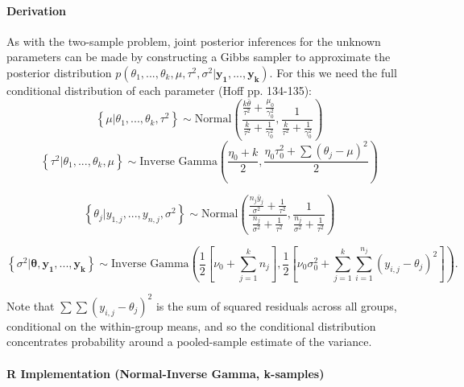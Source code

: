 \documentclass[12pt, a4paper]{article}
\begin{document}
      \paragraph{Derivation}
      As with the two-sample problem, joint posterior inferences for the unknown parameters can be made by constructing a Gibbs sampler to approximate the posterior distribution $p\left(\theta_1,...,\theta_k,\mu,\tau^2,\sigma^2|\mathbf{y_1,...,y_k}\right)$.  For this we need the full conditional distribution of each parameter (Hoff pp. 134-135):
      $$\left\{\mu|\theta_1,...,\theta_k,\tau^2\right\} \sim \text{Normal}\left(\dfrac{\frac{k\bar{\theta}}{\tau^2} + \frac{\mu_0}{\gamma^2_0}}{\frac{k}{\tau^2} + \frac{1}{\gamma^2_0}},\dfrac{1}{\frac{k}{\tau^2}+\frac{1}{\gamma^2_0}}\right)$$
      $$\left\{\tau^2|\theta_1,...,\theta_k,\mu\right\} \sim \text{Inverse Gamma}\left(\dfrac{\eta_0 + k}{2},\dfrac{\eta_0\tau^2_0 + \sum\left(\theta_j-\mu\right)^2}{2}\right)$$

      $$\left\{\theta_j|y_{1,j},...,y_{n,j},\sigma^2\right\} \sim \text{Normal}\left(\dfrac{\frac{n_j\bar{y}_j}{\sigma^2} + \frac{1}{\tau^2}}{\frac{n_j}{\sigma^2}+\frac{1}{\tau^2}},\dfrac{1}{\frac{n_j}{\sigma^2}+\frac{1}{\tau^2}}\right)$$


      $$\left\{\sigma^2|\mathbf{\theta,y_1,...,y_k}\right\} \sim \text{Inverse Gamma}\left(\dfrac{1}{2}\left[\nu_0 + \sum_{j=1}^k n_j\right],\dfrac{1}{2}\left[\nu_0\sigma^2_0 + \sum_{j=1}^k\sum_{i=1}^{n_j}\left(y_{i,j}-\theta_j\right)^2\right]\right).$$

      Note that $\sum\sum\left(y_{i,j}-\theta_j\right)^2$ is the sum of squared residuals across all groups, conditional on the within-group means, and so the conditional distribution concentrates probability around a pooled-sample estimate of the variance.


      \paragraph{R Implementation (Normal-Inverse Gamma, k-samples)}
\end{document}
